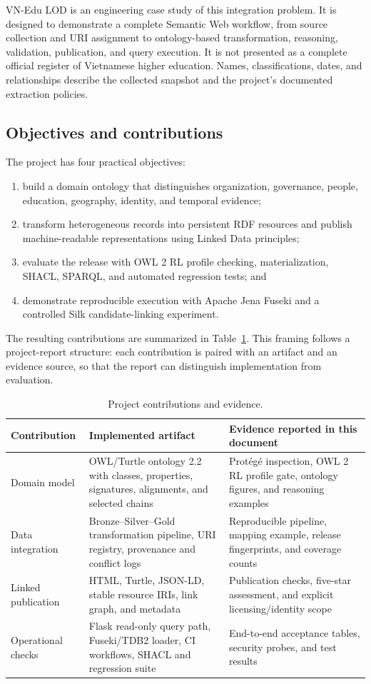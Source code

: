 \documentclass[11pt,a4paper]{article}
\begin{document}
VN-Edu LOD is an engineering case study of this integration problem. It is designed to
demonstrate a complete Semantic Web workflow, from source collection and URI assignment to
ontology-based transformation, reasoning, validation, publication, and query execution.
It is not presented as a complete official register of Vietnamese higher education. Names,
classifications, dates, and relationships describe the collected snapshot and the project's
documented extraction policies.

\subsection{Objectives and contributions}
The project has four practical objectives:
\begin{enumerate}
\item build a domain ontology that distinguishes organization, governance, people, education,
geography, identity, and temporal evidence;
\item transform heterogeneous records into persistent RDF resources and publish machine-readable
representations using Linked Data principles;
\item evaluate the release with OWL 2 RL profile checking, materialization, SHACL, SPARQL,
and automated regression tests; and
\item demonstrate reproducible execution with Apache Jena Fuseki and a controlled Silk
candidate-linking experiment.
\end{enumerate}

The resulting contributions are summarized in Table~\ref{tab:contributions}. This framing
follows a project-report structure: each contribution is paired with an artifact and an
evidence source, so that the report can distinguish implementation from evaluation.
\begin{table}[htbp]\centering\small
\caption{Project contributions and evidence.}\label{tab:contributions}
\begin{tabularx}{\textwidth}{p{3.0cm}XX}\toprule
Contribution & Implemented artifact & Evidence reported in this document \\\midrule
Domain model & OWL/Turtle ontology 2.2 with classes, properties, signatures, alignments, and selected chains & Protégé inspection, OWL 2 RL profile gate, ontology figures, and reasoning examples \\
Data integration & Bronze--Silver--Gold transformation pipeline, URI registry, provenance and conflict logs & Reproducible pipeline, mapping example, release fingerprints, and coverage counts \\
Linked publication & HTML, Turtle, JSON-LD, stable resource IRIs, link graph, and metadata & Publication checks, five-star assessment, and explicit licensing/identity scope \\
Operational checks & Flask read-only query path, Fuseki/TDB2 loader, CI workflows, SHACL and regression suite & End-to-end acceptance tables, security probes, and test results \\
\bottomrule
\end{tabularx}
\end{table}
\end{document}
